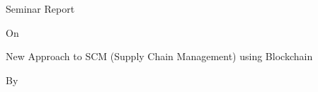 \documentclass[12pt]{article}
\begin{document}
\thispagestyle{empty}
\begin{adjustwidth}{0.0in}{-0.5in}
\begin{Center}
{\fontsize{24pt}{28.8pt}\selectfont Seminar Report\par}
\end{Center}\par

\end{adjustwidth}


\vspace{\baselineskip}
\begin{Center}

{\fontsize{14pt}{16.8pt}\selectfont On\par}\end{Center}\par


\vspace{\baselineskip}
\begin{adjustwidth}{-0.5in}{-0.5in}
\begin{FlushLeft}
{\fontsize{16pt}{19.2pt}\selectfont New Approach to SCM (Supply Chain Management) using Blockchain{\fontsize{10pt}{12.0pt}\par}\par}
\end{FlushLeft}\par

\end{adjustwidth}


\vspace{\baselineskip}
\begin{adjustwidth}{0.1in}{0.0in}
\begin{Center}
{\fontsize{16pt}{19.2pt}\selectfont By\par}
\end{Center}\par

\end{adjustwidth}


\vspace{\baselineskip}
\tab \tab 
{}\par


\vspace{\baselineskip}
\end{document}

